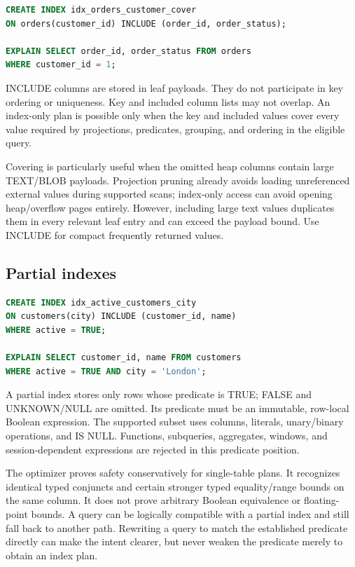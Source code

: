 \begin{lstlisting}[language=SQL]
CREATE INDEX idx_orders_customer_cover
ON orders(customer_id) INCLUDE (order_id, order_status);

EXPLAIN SELECT order_id, order_status FROM orders
WHERE customer_id = 1;
\end{lstlisting}

INCLUDE columns are stored in leaf payloads. They do not participate in key ordering or uniqueness. Key and included column lists may not overlap. An index-only plan is possible only when the key and included values cover every value required by projections, predicates, grouping, and ordering in the eligible query.

Covering is particularly useful when the omitted heap columns contain large TEXT/BLOB payloads. Projection pruning already avoids loading unreferenced external values during supported scans; index-only access can avoid opening heap/overflow pages entirely. However, including large text values duplicates them in every relevant leaf entry and can exceed the payload bound. Use INCLUDE for compact frequently returned values.

\subsection{Partial indexes}

\begin{lstlisting}[language=SQL]
CREATE INDEX idx_active_customers_city
ON customers(city) INCLUDE (customer_id, name)
WHERE active = TRUE;

EXPLAIN SELECT customer_id, name FROM customers
WHERE active = TRUE AND city = 'London';
\end{lstlisting}

A partial index stores only rows whose predicate is TRUE; FALSE and UNKNOWN/NULL are omitted. Its predicate must be an immutable, row-local Boolean expression. The supported subset uses columns, literals, unary/binary operations, and IS NULL. Functions, subqueries, aggregates, windows, and session-dependent expressions are rejected in this predicate position.

The optimizer proves safety conservatively for single-table plans. It recognizes identical typed conjuncts and certain stronger typed equality/range bounds on the same column. It does not prove arbitrary Boolean equivalence or floating-point bounds. A query can be logically compatible with a partial index and still fall back to another path. Rewriting a query to match the established predicate directly can make the intent clearer, but never weaken the predicate merely to obtain an index plan.

